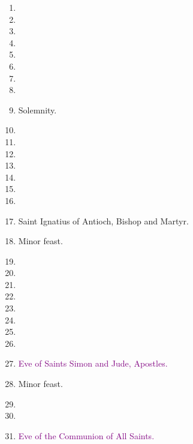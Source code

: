 		\begin{enumerate}
			\item %
			\item %
			\item %
			\item %
			\item %
			\item %
			\item %
			\item %
			\item {} Solemnity.
			\item %
			\item %
			\item %
			\item %
			\item %
			\item %
			\item %
			\item Saint Ignatius of Antioch, Bishop and Martyr. 
			\item {} Minor feast.
			\item %
			\item %
			\item %
			\item %
			\item %
			\item %
			\item %
			\item %
			\item \textcolor{purple}{Eve of Saints Simon and Jude, Apostles.}
			\item {} Minor feast.
			\item %
			\item %
			\item \textcolor{purple}{Eve of the Communion of All Saints.}
		\end{enumerate}
	
	\pagebreak[1]
	
	\pagebreak{}
	
